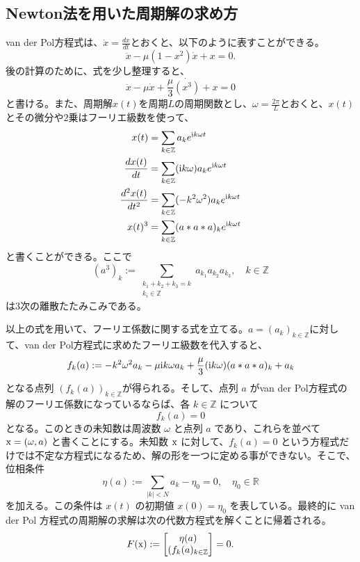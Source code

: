 \subsection{Newton法を用いた周期解の求め方}

van der Pol方程式は、$\dot{x} = \frac{dx}{dt}$とおくと、以下のように表すことができる。
$$
\ddot{x} - \mu(1-x^2)\dot{x} + x = 0.
$$
後の計算のために、式を少し整理すると、
$$
\ddot{x} - \mu\dot{x} + \frac{\mu}{3} \dot{(x^3)} + x = 0
$$
と書ける。また、周期解$x(t)$を周期$L$の周期関数とし、$\omega = \frac{2\pi}{L}$とおくと、$x(t)$とその微分や$2$乗はフーリエ級数を使って、
\begin{align*}
x(t) &= \sum_{k \in \mathbb{Z}} a_k e^{\mathrm{i} k\omega t}\\
\frac{dx(t)}{dt} &= \sum_{k \in \mathbb{Z}}(\mathrm{i} k \omega) a_k e^{\mathrm{i} k \omega t} \\
\frac{d^2 x(t)}{dt^2} &= \sum_{k \in \mathbb{Z}} (-  k^2 \omega^2 )a_k e^{\mathrm{i} k\omega t} \\
x(t)^3 &= \sum_{k \in \mathbb{Z}} (a * a * a)_k e^{\mathrm{i} k \omega t}
\end{align*}
と書くことができる。ここで
\begin{equation*}
(a^3)_k := \sum_{\substack{k_1+k_2+k_3 = k\\k_i\in\mathbb{Z}}} a_{k_1}a_{k_2}
a_{k_3},\quad k\in\mathbb{Z}
\end{equation*}
は3次の離散たたみこみである。

以上の式を用いて、フーリエ係数に関する式を立てる。$a = (a_k)_{k \in \mathbb{Z}}$に対して、van der Pol方程式に求めたフーリエ級数を代入すると、
$$
f_k(a) := -k^2\omega^2 a_k - \mu\mathrm{i} k \omega a_k + \frac{\mu }{3}(\mathrm{i} k \omega)(a*a*a)_k + a_k
$$
となる点列 $\left(f_k(a)\right)_{k\in\mathbb{Z}}$が得られる。そして、点列 $a$ がvan der Pol方程式の解のフーリエ係数になっているならば、各 $k\in\mathbb{Z}$ について
$$
f_k(a) = 0
$$
となる。このときの未知数は周波数 $\omega$ と点列 $a$ であり、これらを並べて $\mathrm x = (\omega,a)$ と書くことにする。未知数 $\mathrm x$ に対して、$f_k(a) = 0$ という方程式だけでは不定な方程式になるため、解の形を一つに定める事ができない。そこで、位相条件
\begin{equation*}
    \eta (a) := \sum_{|k|<N} a_k - \eta_0=0, \quad \eta_0 \in \mathbb{R} 
\end{equation*}
を加える。この条件は $x(t)$ の初期値 $x(0) = \eta_0$ を表している。最終的に van der Pol 方程式の周期解の求解は次の代数方程式を解くことに帰着される。
$$
    F(\mathrm x) := 
    \begin{bmatrix}
    \eta (a) \\
    (f_k(a)_{k\in\mathbb{Z}}
    \end{bmatrix}
    =0.
$$

